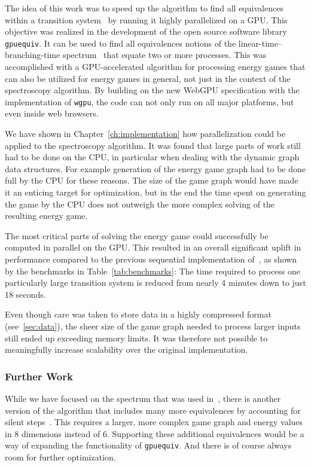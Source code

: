 The idea of this work was to speed up the algorithm to find all equivalences
within a transition system~\cite{bisping2023process} by running it highly
parallelized on a GPU\@.
This objective was realized in the development of the open source software
library \texttt{gpuequiv}.
It can be used to find all equivalences notions of the
linear-time--branching-time spectrum~\cite{glabbeek1990spectrum}
that equate two or more processes.
This was accomplished with a GPU-accelerated algorithm for processing energy
games that can also be utilized for energy games in general,
not just in the context of the spectroscopy algorithm.
By building on the new WebGPU specification with the implementation of
\texttt{wgpu},
the code can not only run on all major platforms,
but even inside web browsers.

We have shown in Chapter~\ref{ch:implementation} how parallelization could be
applied to the spectroscopy algorithm.
It was found that large parts of work still had to be done on the CPU,
in particular when dealing with the dynamic graph data structures.
For example generation of the energy game graph had to be done full by the CPU
for these reasons.
The size of the game graph would have made it an enticing target for
optimization,
but in the end the time spent on generating the game by the CPU does not
outweigh the more complex solving of the resulting energy game.

The most critical parts of solving the energy game could successfully be
computed in parallel on the GPU\@.
This resulted in an overall significant uplift in performance compared to the
previous sequential implementation of~\cite{bisping2023process},
as shown by the benchmarks in Table~\ref{tab:benchmarks}:
The time required to process one particularly large transition system is
reduced from nearly 4 minutes down to just 18 seconds.

Even though care was taken to store data in a highly compressed format
(see~\ref{sec:data}),
the sheer size of the game graph needed to process larger inputs still
ended up exceeding memory limits.
It was therefore not possible to meaningfully increase scalability
over the original implementation.

\subsubsection{Further Work}

While we have focused on the spectrum that was used
in~\cite{bisping2023process},
there is another version of the algorithm that includes many more equivalences
by accounting for silent steps~\cite{bisping2023silent}.
This requires a larger,
more complex game graph and energy values in 8 dimensions instead of 6.
Supporting these additional equivalences would be a way of expanding the
functionality of \texttt{gpuequiv}.
And there is of course always room for further optimization.
